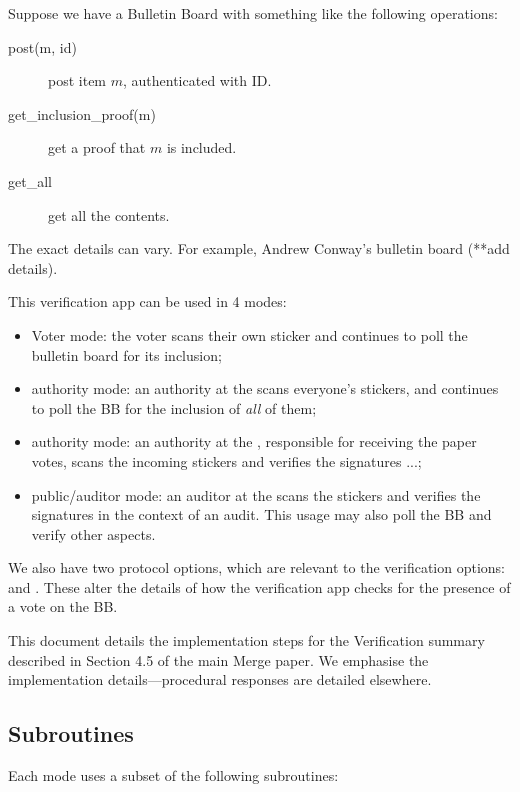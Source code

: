 \documentclass{article}
\begin{document}
Suppose we have a Bulletin Board with something like the following operations:
    \begin{description}
        \item[post(m, id)] post item $m$, authenticated with ID.
        \item[get\_inclusion\_proof(m)] get a proof that $m$ is included.
        \item[get\_all] get all the contents.
    \end{description}
    The exact details can vary. For example, Andrew Conway's bulletin board (**add details).

    This verification app can be used in 4 modes:
    \begin{itemize}
        \item Voter mode: the voter scans their own sticker and continues to poll the bulletin board for its inclusion;
        \item \remoteVotingCenter{} authority mode: an authority at the \remoteVotingCenter{} scans everyone's stickers, and continues to poll the BB for the inclusion of \emph{all} of them;
        \item \localVotingCenter{} authority mode: an authority at the \localVotingCenter{}, responsible for receiving the paper votes, scans the incoming stickers and verifies the signatures ...;
        \item \localVotingCenter{} public/auditor mode: an auditor at the \localVotingCenter{} scans the stickers and verifies the signatures in the context of an audit. This usage may also poll the BB and verify other aspects.
    \end{itemize}

    We also have two protocol options, which are relevant to the verification options:
    \BBInclusionCheck{} and \StickerBBUpload{}. These alter the details of how the verification app checks for the presence of a vote on the BB.

    This document details the implementation steps for the Verification summary described in Section 4.5 of the main Merge paper. We emphasise the implementation details---procedural responses are detailed elsewhere.

\subsection{Subroutines}
Each mode uses a subset of the following subroutines:
\end{document}

